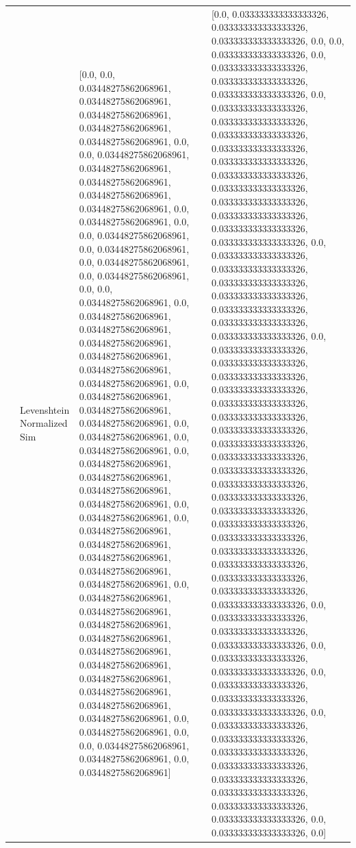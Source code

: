 \begin{tabular}{llll}
 & Levenshtein Normalized Sim & [0.0, 0.0, 0.03448275862068961, 0.03448275862068961, 0.03448275862068961, 0.03448275862068961, 0.03448275862068961, 0.0, 0.0, 0.03448275862068961, 0.03448275862068961, 0.03448275862068961, 0.03448275862068961, 0.03448275862068961, 0.0, 0.03448275862068961, 0.0, 0.0, 0.03448275862068961, 0.0, 0.03448275862068961, 0.0, 0.03448275862068961, 0.0, 0.03448275862068961, 0.0, 0.0, 0.03448275862068961, 0.0, 0.03448275862068961, 0.03448275862068961, 0.03448275862068961, 0.03448275862068961, 0.03448275862068961, 0.03448275862068961, 0.0, 0.03448275862068961, 0.03448275862068961, 0.03448275862068961, 0.0, 0.03448275862068961, 0.0, 0.03448275862068961, 0.0, 0.03448275862068961, 0.03448275862068961, 0.03448275862068961, 0.03448275862068961, 0.0, 0.03448275862068961, 0.0, 0.03448275862068961, 0.03448275862068961, 0.03448275862068961, 0.03448275862068961, 0.03448275862068961, 0.0, 0.03448275862068961, 0.03448275862068961, 0.03448275862068961, 0.03448275862068961, 0.03448275862068961, 0.03448275862068961, 0.03448275862068961, 0.03448275862068961, 0.03448275862068961, 0.03448275862068961, 0.0, 0.03448275862068961, 0.0, 0.0, 0.03448275862068961, 0.03448275862068961, 0.0, 0.03448275862068961] & [0.0, 0.033333333333333326, 0.033333333333333326, 0.033333333333333326, 0.0, 0.0, 0.033333333333333326, 0.0, 0.033333333333333326, 0.033333333333333326, 0.033333333333333326, 0.0, 0.033333333333333326, 0.033333333333333326, 0.033333333333333326, 0.033333333333333326, 0.033333333333333326, 0.033333333333333326, 0.033333333333333326, 0.033333333333333326, 0.033333333333333326, 0.033333333333333326, 0.033333333333333326, 0.0, 0.033333333333333326, 0.033333333333333326, 0.033333333333333326, 0.033333333333333326, 0.033333333333333326, 0.033333333333333326, 0.033333333333333326, 0.0, 0.033333333333333326, 0.033333333333333326, 0.033333333333333326, 0.033333333333333326, 0.033333333333333326, 0.033333333333333326, 0.033333333333333326, 0.033333333333333326, 0.033333333333333326, 0.033333333333333326, 0.033333333333333326, 0.033333333333333326, 0.033333333333333326, 0.033333333333333326, 0.033333333333333326, 0.033333333333333326, 0.033333333333333326, 0.033333333333333326, 0.033333333333333326, 0.033333333333333326, 0.0, 0.033333333333333326, 0.033333333333333326, 0.033333333333333326, 0.0, 0.033333333333333326, 0.033333333333333326, 0.0, 0.033333333333333326, 0.033333333333333326, 0.033333333333333326, 0.0, 0.033333333333333326, 0.033333333333333326, 0.033333333333333326, 0.033333333333333326, 0.033333333333333326, 0.033333333333333326, 0.033333333333333326, 0.033333333333333326, 0.0, 0.033333333333333326, 0.0] \\

\end{tabular}
